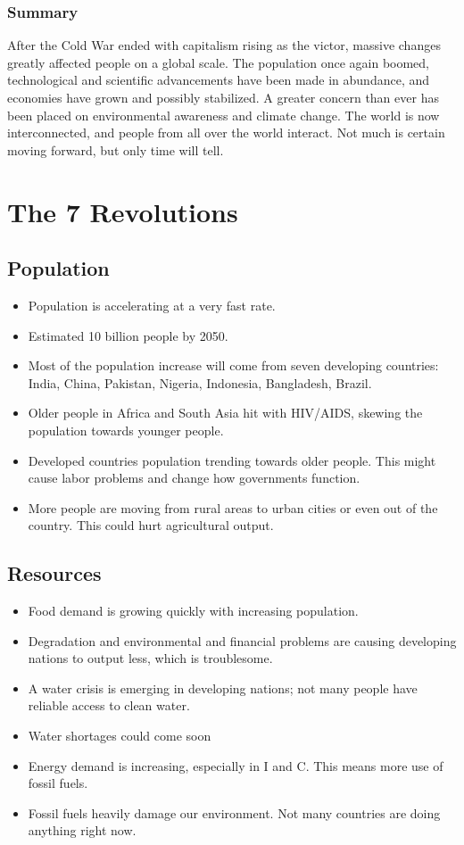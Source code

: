 \documentclass[11pt]{article}
\begin{document}
\subsubsection{Summary}
\label{sec:org8566add}

After the Cold War ended with capitalism rising as the victor, massive changes greatly affected people on a global scale. The population once again boomed, technological and scientific advancements have been made in abundance, and economies have grown and possibly stabilized. A greater concern than ever has been placed on environmental awareness and climate change. The world is now interconnected, and people from all over the world interact. Not much is certain moving forward, but only time will tell.
\section{The 7 Revolutions}
\label{sec:org749aaa0}
\subsection{Population}
\label{sec:orgc18ccc9}

\begin{itemize}
\item Population is accelerating at a very fast rate.
\item Estimated 10 billion people by 2050.
\item Most of the population increase will come from seven developing countries: India, China, Pakistan, Nigeria, Indonesia, Bangladesh, Brazil.
\item Older people in Africa and South Asia hit with HIV/AIDS, skewing the population towards younger people.
\item Developed countries population trending towards older people. This might cause labor problems and change how governments function.
\item More people are moving from rural areas to urban cities or even out of the country. This could hurt agricultural output.
\end{itemize}
\subsection{Resources}
\label{sec:orgd9bd112}

\begin{itemize}
\item Food demand is growing quickly with increasing population.
\item Degradation and environmental and financial problems are causing developing nations to output less, which is troublesome.
\item A water crisis is emerging in developing nations; not many people have reliable access to clean water.
\item Water shortages could come soon
\item Energy demand is increasing, especially in I and C. This means more use of fossil fuels.
\item Fossil fuels heavily damage our environment. Not many countries are doing anything right now.
\end{itemize}
\end{document}
